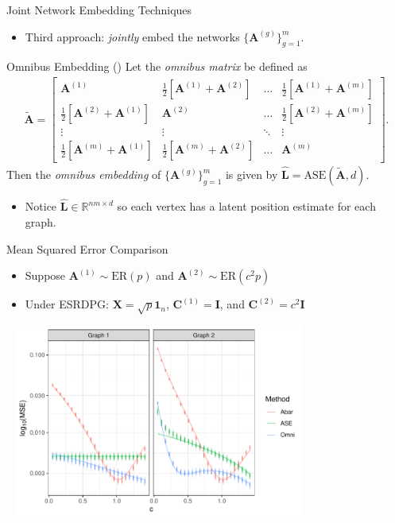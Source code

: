 \documentclass[handout]{beamer}
\newcommand{\bvar}[1]{\mathbf{#1}}
\begin{document}
\begin{frame}{Joint Network Embedding Techniques}
\begin{itemize}
        \item Third approach: \textit{jointly} embed the networks $\{\bvar{A}^{(g)}\}_{g=1}^m$.
\end{itemize}
\begin{block}{Omnibus Embedding (\cite{OmniCLT})}
Let the \textit{omnibus matrix} be defined as
\begin{align*}
    \tilde{\bvar{A}} = \begin{bmatrix}
        \bvar{A}^{(1)} &\frac{1}{2}[\bvar{A}^{(1)} + \bvar{A}^{(2)}] & \dots & \frac{1}{2}[\bvar{A}^{(1)} + \bvar{A}^{(m)}]\\
        \frac{1}{2}[\bvar{A}^{(2)} + \bvar{A}^{(1)}] & \bvar{A}^{(2)} & \dots & \frac{1}{2}[\bvar{A}^{(2)} + \bvar{A}^{(m)}]\\
        \vdots & \vdots & \ddots & \vdots\\
        \frac{1}{2}[\bvar{A}^{(m)} + \bvar{A}^{(1)}] & \frac{1}{2}[\bvar{A}^{(m)} + \bvar{A}^{(2)}] & \dots & \bvar{A}^{(m)}
    \end{bmatrix}.
\end{align*}
Then the \textit{omnibus embedding} of $\{\bvar{A}^{(g)}\}_{g=1}^m$ is given by $\hat{\bvar{L}} = \text{ASE}(\tilde{\bvar{A}}, d)$. 
\end{block}
\begin{itemize}
        \item Notice $\hat{\bvar{L}}\in\mathbb{R}^{nm\times d}$ so each vertex has a latent position estimate for each graph.  
\end{itemize}
\end{frame}


\begin{frame}{Mean Squared Error Comparison}
    \begin{itemize}
        \item Suppose $\bvar{A}^{(1)}\sim\text{ER}(p)$ and $\bvar{A}^{(2)}\sim\text{ER}(c^2p)$
        \item Under ESRDPG: $\bvar{X} = \sqrt{p}\bvar{1}_n$,  $\bvar{C}^{(1)} = \bvar{I}$, and $\bvar{C}^{(2)} = c^2\bvar{I}$
    \end{itemize}\pause
\begin{center}
    \includegraphics[width = 4in, height = 2.5in]{1d_mse.pdf}
\end{center}
\end{frame}
\end{document}
